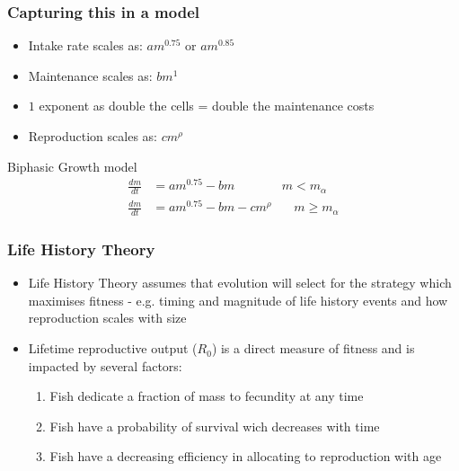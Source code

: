 \documentclass[handout]{beamer}
\begin{document}
\begin{frame}
	\frametitle{Capturing this in a model}
	\begin{itemize}
		\item Intake rate scales as: $am^{0.75}$ or $am^{0.85}$
		
		\item Maintenance scales as: $bm^{1}$
		\item $1$ exponent as double the cells = double the maintenance costs
		\item Reproduction scales as: $cm^{\rho}$
	\end{itemize}

	\begin{block}{Biphasic Growth model}
		\begin{align*}
			\frac{dm}{dt} &= am^{0.75} - bm \ \ \ \ \ \ \ \ \ \ \ \ \ \ \ \ \ m < m_{\alpha}\\
			\frac{dm}{dt} &= am^{0.75} - bm - cm^{\rho} \ \ \ \ \  \ \ \ m \geq m_{\alpha}
		\end{align*}
	\end{block}
\end{frame}

\begin{frame}
	\frametitle{Life History Theory}
	\begin{itemize}
		\item Life History Theory assumes that evolution will select for the strategy which maximises fitness - e.g. timing and magnitude of life history events and how reproduction scales with size
		\item Lifetime reproductive output ($R_0$) is a direct measure of fitness and is impacted by several factors:
		\begin{enumerate}
			\item Fish dedicate a fraction of mass to fecundity at any time 
			\item Fish have a probability of survival wich decreases with time
			\item Fish have a decreasing efficiency in allocating to reproduction with age
		\end{enumerate}
	\end{itemize}
\end{frame}
\end{document}
